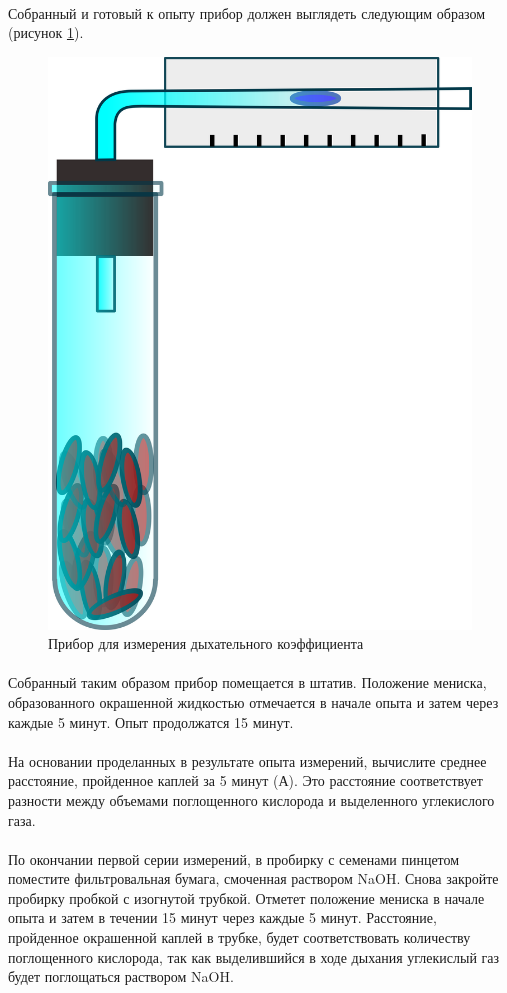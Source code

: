 \paragraph*{}Собранный и готовый к опыту прибор должен выглядеть следующим образом (рисунок \ref{breazing_index}). 

\begin{figure}[h!]
  \centering
       \includegraphics[width=0.3\linewidth]{pictures/breazing_index}
\caption{Прибор для измерения дыхательного коэффициента}
\label{breazing_index}
\end{figure}

\paragraph*{}Собранный таким образом прибор помещается в штатив. Положение мениска, образованного окрашенной жидкостью отмечается в начале опыта и затем через каждые 5 минут. Опыт продолжатся 15 минут.

\paragraph*{}На основании проделанных в результате опыта измерений, вычислите среднее расстояние, пройденное каплей за 5 минут (А). Это расстояние соответствует разности между объемами поглощенного кислорода и выделенного углекислого газа.

\paragraph*{}По окончании первой серии измерений, в пробирку с семенами пинцетом поместите фильтровальная бумага, смоченная раствором NaOH. Снова закройте пробирку пробкой с изогнутой трубкой. Отметет положение мениска в начале опыта и затем в течении 15 минут через каждые 5 минут. Расстояние, пройденное окрашенной каплей в трубке, будет соответствовать количеству поглощенного кислорода, так как выделившийся в ходе дыхания  углекислый газ будет поглощаться раствором NaOH.

